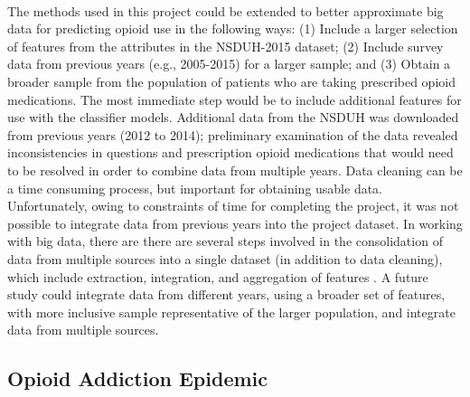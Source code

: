 \\\documentclass[sigconf]{acmart}
\begin{document}
The methods used in this project could be extended to better approximate big 
data for predicting opioid use in the following ways: (1) Include a larger 
selection of features from the attributes in the NSDUH-2015 dataset; (2) 
Include survey data from previous years (e.g., 2005-2015) for a larger sample;  
and (3) Obtain a broader sample from the population of patients who are 
taking prescribed opioid medications. The most immediate step would be to 
include additional features for use with the classifier models. Additional 
data from the NSDUH was downloaded from previous years (2012 to 2014); 
preliminary examination of the data revealed inconsistencies in questions 
and prescription opioid medications that would need to be resolved in order 
to combine data from multiple years. Data cleaning can be a time consuming 
process, but important for obtaining usable data. Unfortunately, owing to 
constraints of time for completing the project, it was not possible to
integrate data from previous years into the project dataset. In working with
big data, there are there are several steps involved in the consolidation of 
data from multiple sources into a single dataset (in addition to data 
cleaning), which include extraction, integration, and aggregation of features  
\cite{rahm00}. A future study could integrate data from different years, 
using a broader set of features, with more inclusive sample representative
of the larger population, and integrate data from multiple sources. 

\subsection{Opioid Addiction Epidemic}
\end{document}

